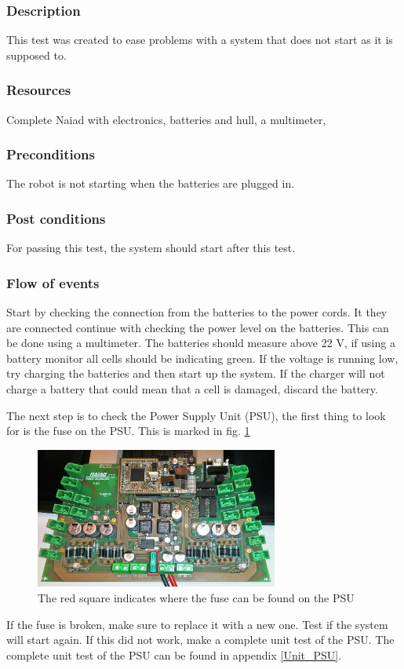 \subsubsection*{Description}
This test was created to ease problems with a system that does not start as it is supposed to. 
\subsubsection*{Resources}
Complete Naiad with electronics, batteries and hull, a multimeter,
\subsubsection*{Preconditions}
The robot is not starting when the batteries are plugged in. 
\subsubsection*{Post conditions}
For passing this test, the system should start after this test. 
\subsubsection*{Flow of events}
Start by checking the connection from the batteries to the power cords. It they are connected continue with checking the power level on the batteries. This can be done using a multimeter. The batteries should measure above 22 V, if using a battery monitor all cells should be indicating green. If the voltage is running low, try charging the batteries and then start up the system. If the charger will not charge a battery that could mean that a cell is damaged, discard the battery. 

The next step is to check the Power Supply Unit (PSU), the first thing to look for is the fuse on the PSU. This is marked in fig. \ref{PSU_fuse}
\begin{figure}[!ht]
	\begin{center}
		\includegraphics[width=80mm]{./Images/Tests/powerboard_fuse.jpg}
		\caption{The red square indicates where the fuse can be found on the PSU}
		\label{PSU_fuse}
	\end{center}
\end{figure}
If the fuse is broken, make sure to replace it with a new one. Test if the system will start again. If this did not work, make a complete unit test of the PSU. The complete unit test of the PSU can be found in appendix \ref{Unit_PSU}.

